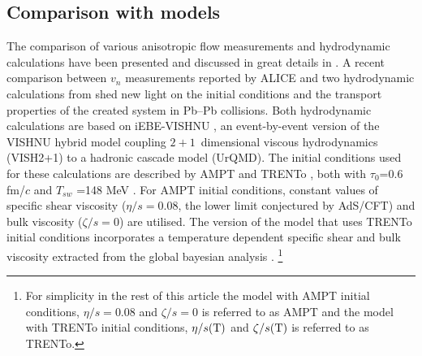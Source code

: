 \subsection{Comparison with models}
\label{SubSec:hydro}

The comparison of various anisotropic flow measurements and hydrodynamic calculations have been presented and discussed in great details in \cite{Xu:2016hmp, McDonald:2016vlt, Zhao:2017yhj}. A recent comparison between $v_{n}$ measurements reported by ALICE \cite{Acharya:2018zuq} and two hydrodynamic calculations from \cite{Zhao:2017yhj} shed new light on the initial conditions and the transport properties of the created system in Pb--Pb collisions. Both hydrodynamic calculations are based on iEBE-VISHNU \cite{Shen:2014vra}, an event-by-event version of the VISHNU hybrid model \cite{Song:2010aq} coupling $2+1$~dimensional viscous hydrodynamics (VISH2+1) \cite{Song:2007fn} to a hadronic cascade model (UrQMD). The initial conditions used for these calculations are described by AMPT \cite{Lin:2004en} and TRENTo \cite{Moreland:2014oya}, both with $\tau_{0}$=0.6 fm/$c$ and $T_{sw}$ =148 MeV \cite{Bernhard:2016tnd}. For AMPT initial conditions, constant values of specific shear viscosity ($\eta/s =0.08$, the lower limit conjectured by AdS/CFT) and bulk viscosity ($\zeta/s = 0$) are utilised. The version of the model that uses TRENTo \cite{Moreland:2014oya} initial conditions incorporates a temperature dependent specific shear and bulk viscosity extracted from the global bayesian analysis \cite{Bernhard:2016tnd}. \footnote{ For simplicity in the rest of this article the model with AMPT initial conditions, $\eta/s =0.08$ and $\zeta/s =0$ is referred to as AMPT and the model with TRENTo initial conditions, $\eta/s(\rm{T})$ and $\zeta/s(\rm{T})$ is referred to as TRENTo.} 

